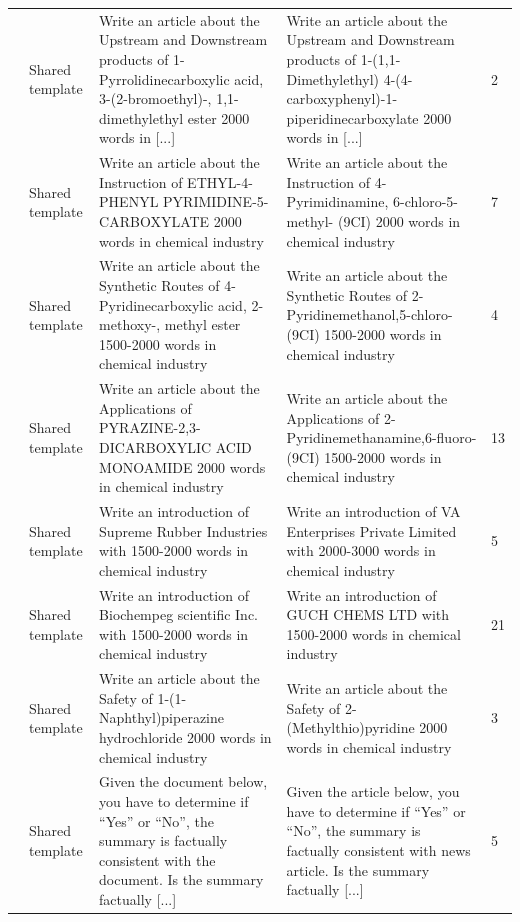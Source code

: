 {\begin{longtable}{@{}p{}p{}p{}p{}p{}@{}}
\addlinespace[3pt]
229 & Shared template & \raggedright Write an article about the Upstream and Downstream products of 1-Pyrrolidinecarboxylic acid, 3-(2-bromoethyl)-, 1,1-dimethylethyl ester 2000 words in [...] & \raggedright Write an article about the Upstream and Downstream products of 1-(1,1-Dimethylethyl) 4-(4-carboxyphenyl)-1-piperidinecarboxylate 2000 words in [...] & 2\\
\addlinespace[3pt]
242 & Shared template & \raggedright Write an article about the Instruction of ETHYL-4-PHENYL PYRIMIDINE-5-CARBOXYLATE 2000 words in chemical industry & \raggedright Write an article about the Instruction of 4-Pyrimidinamine, 6-chloro-5-methyl- (9CI) 2000 words in chemical industry & 7\\
\addlinespace[3pt]
282 & Shared template & \raggedright Write an article about the Synthetic Routes of 4-Pyridinecarboxylic acid, 2-methoxy-, methyl ester 1500-2000 words in chemical industry & \raggedright Write an article about the Synthetic Routes of 2-Pyridinemethanol,5-chloro-(9CI) 1500-2000 words in chemical industry & 4\\
\addlinespace[3pt]
341 & Shared template & \raggedright Write an article about the Applications of PYRAZINE-2,3-DICARBOXYLIC ACID MONOAMIDE 2000 words in chemical industry & \raggedright Write an article about the Applications of 2-Pyridinemethanamine,6-fluoro-(9CI) 1500-2000 words in chemical industry & 13\\
\addlinespace[3pt]
343 & Shared template & \raggedright Write an introduction of Supreme Rubber Industries with 1500-2000 words in chemical industry & \raggedright Write an introduction of VA Enterprises Private Limited with 2000-3000 words in chemical industry & 5\\
\addlinespace[3pt]
385 & Shared template & \raggedright Write an introduction of Biochempeg scientific Inc. with 1500-2000 words in chemical industry & \raggedright Write an introduction of GUCH CHEMS LTD with 1500-2000 words in chemical industry & 21\\
\addlinespace[3pt]
438 & Shared template & \raggedright Write an article about the Safety of 1-(1-Naphthyl)piperazine hydrochloride 2000 words in chemical industry & \raggedright Write an article about the Safety of 2-(Methylthio)pyridine 2000 words in chemical industry & 3\\
\addlinespace[3pt]
516 & Shared template & \raggedright Given the document below, you have to determine if ``Yes'' or ``No'', the summary is factually consistent with the document. Is the summary factually [...] & \raggedright Given the article below, you have to determine if ``Yes'' or ``No'', the summary is factually consistent with news article. Is the summary factually [...] & 5\\

\end{longtable}}
